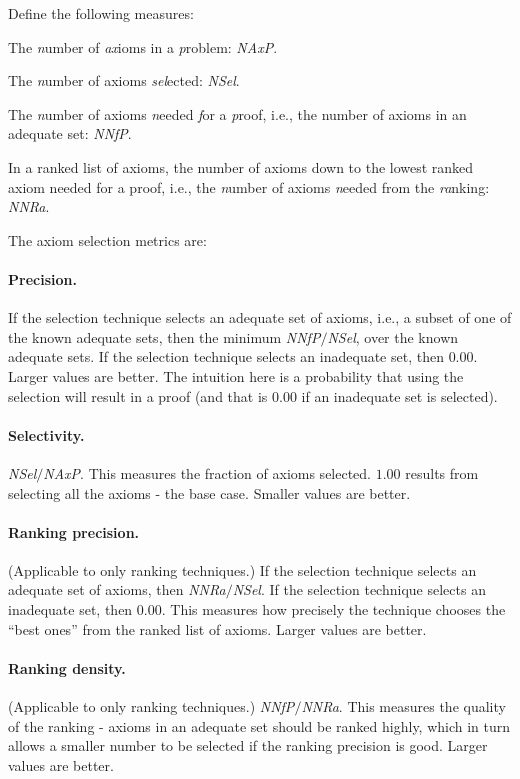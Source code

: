 \documentclass[EPiC]{easychair}
\newenvironment{packed_itemize}{
\vspace*{-0.5em}
\begin{itemize}
  \setlength{\partopsep}{0pt}
  \setlength{\itemsep}{1pt}
  \setlength{\parskip}{0pt}
  \setlength{\parsep}{0pt}
}{\end{itemize}}
\begin{document}
Define the following measures:
\begin{packed_itemize}
\item The \emph{n}umber of \emph{ax}ioms in a \emph{p}roblem: \emph{NAxP}.
\item The \emph{n}umber of axioms \emph{sel}ected: \emph{NSel}.
\item The \emph{n}umber of axioms \emph{n}eeded \emph{f}or a \emph{p}roof, 
      i.e., the number of axioms in an adequate set: \emph{NNfP}.
\item In a ranked list of axioms, the number of axioms down to the lowest ranked
      axiom needed for a proof, i.e., the \emph{n}umber of axioms
      \emph{n}eeded from the \emph{ra}nking: \emph{NNRa}.
\end{packed_itemize}

The axiom selection metrics are:

\paragraph{Precision.}
If the selection technique selects an adequate set of axioms, i.e., a subset
of one of the known adequate sets, then the minimum \emph{NNfP}$/$\emph{NSel},
over the known adequate sets.
If the selection technique selects an inadequate set, then $0.00$.
Larger values are better.
The intuition here is a probability that using the selection will result
in a proof (and that is $0.00$ if an inadequate set is selected).

\paragraph{Selectivity.}
\emph{NSel}$/$\emph{NAxP}.
This measures the fraction of axioms selected.
$1.00$ results from selecting all the axioms - the base case.
Smaller values are better.

\paragraph{Ranking precision.}
(Applicable to only ranking techniques.)
If the selection technique selects an adequate set of axioms, then
\emph{NNRa}$/$\emph{NSel}.
If the selection technique selects an inadequate set, then $0.00$.
This measures how precisely the technique chooses the ``best ones'' from
the ranked list of axioms.
Larger values are better.

\paragraph{Ranking density.}
(Applicable to only ranking techniques.)
\emph{NNfP}$/$\emph{NNRa}.
This measures the quality of the ranking - axioms in an adequate set should
be ranked highly, which in turn allows a smaller number to be selected if
the ranking precision is good.
Larger values are better.
\end{document}
